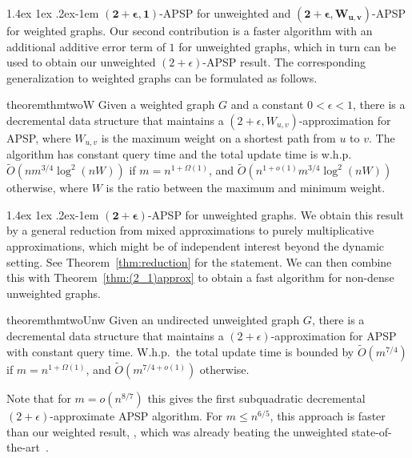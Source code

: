 \documentclass[11pt]{article}
\makeatletter
\theoremstyle{definition}
\theoremstyle{remark}
\renewcommand{\paragraph}{%
  \@startsection{paragraph}{4}%
  {\z@}{1.4ex \@plus 1ex \@minus .2ex}{-1em}%
  {\normalfont\normalsize\bfseries}%
}
\makeatother
\begin{document}
\begin{titlepage}
\paragraph{$\mathbf{(2+\epsilon, 1)}$-APSP for unweighted and $\mathbf{(2+\epsilon, W_{u,v})}$-APSP for weighted graphs.} 
Our second contribution is a faster algorithm with an additional additive error term of $1$ for unweighted graphs, which in turn can be used to obtain our unweighted $(2+\epsilon)$-APSP result.
The corresponding generalization to weighted graphs can be formulated as follows.

\begin{restatable}{theorem}{thmtwoW}\label{thm:(2_1)approx}
    Given a weighted graph $G$ and a constant $0 < \epsilon < 1$, there is a decremental data structure that maintains a $(2+\epsilon,W_{u,v})$-approximation for APSP, where $W_{u,v}$ is the maximum weight on a shortest path from $u$ to $v$. The algorithm has constant query time and the total update time is w.h.p.~$\tilde O( nm^{3/4}\log^2(nW))$ if $m=n^{1+\Omega(1)}$, and $\tilde O( n^{1+o(1)}m^{3/4}\log^2(nW))$ otherwise, where $W$ is the ratio between the maximum and minimum weight. 
\end{restatable}

\paragraph{$\mathbf{(2+\epsilon)}$-APSP for unweighted graphs.}
We obtain this result by a general reduction from mixed approximations to purely multiplicative approximations, which might be of independent interest beyond the dynamic setting. See Theorem~\ref{thm:reduction} for the statement. We can then combine this with Theorem~\ref{thm:(2_1)approx} to obtain a fast algorithm for non-dense unweighted graphs. 

\begin{restatable}{theorem}{thmtwoUnw}\label{thm:unweighted_2}
    Given an undirected unweighted graph $G$, there is a decremental data structure that maintains a $(2+\epsilon)$-approximation for APSP with constant query time. W.h.p.\ the total update time is bounded by $\tilde O( m^{7/4})$ if $m=n^{1+\Omega(1)}$, and $\tilde O( m^{7/4+o(1)})$ otherwise.
\end{restatable}

Note that for $m=o(n^{8/7})$ this gives the first subquadratic decremental $(2+\epsilon)$-approximate APSP algorithm. 
For $m\leq n^{6/5}$, this approach is faster than our weighted result, , which was already beating the unweighted state-of-the-art~\cite{AbrahamC13,HKN2016}. 



\end{titlepage}
\end{document}
